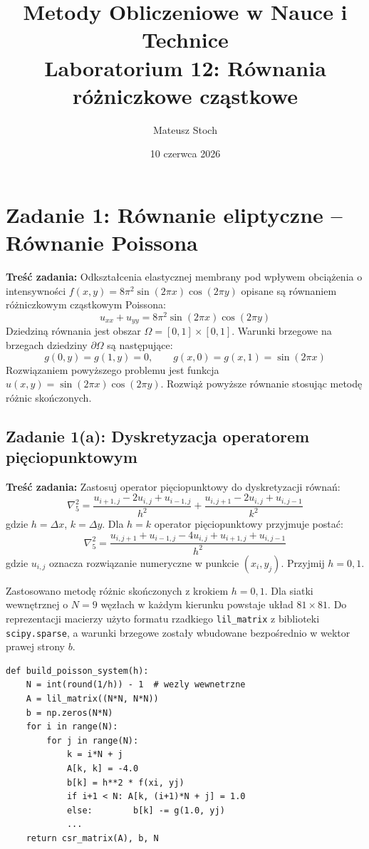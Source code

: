 \documentclass[12pt, a4paper]{article}
\title{
  \textbf{Metody Obliczeniowe w Nauce i Technice} \\[0.5em]
  \large Laboratorium 12: Równania różniczkowe cząstkowe
}
\author{Mateusz Stoch}
\date{10 czerwca 2026}
\begin{document}
\maketitle

\section{Zadanie 1: Równanie eliptyczne -- Równanie Poissona}

\textbf{Treść zadania:} Odkształcenia elastycznej membrany pod wpływem obciążenia o intensywności $f(x,y) = 8\pi^2 \sin(2\pi x)\cos(2\pi y)$ opisane są równaniem różniczkowym cząstkowym Poissona:
\[
  u_{xx} + u_{yy} = 8\pi^2 \sin(2\pi x)\cos(2\pi y)
\]
Dziedziną równania jest obszar $\Omega = [0,1]\times[0,1]$. Warunki brzegowe na brzegach dziedziny $\partial\Omega$ są następujące:
\[
  g(0,y) = g(1,y) = 0, \qquad g(x,0) = g(x,1) = \sin(2\pi x)
\]
Rozwiązaniem powyższego problemu jest funkcja $u(x,y) = \sin(2\pi x)\cos(2\pi y)$. Rozwiąż powyższe równanie stosując metodę różnic skończonych.

\subsection{Zadanie 1(a): Dyskretyzacja operatorem pięciopunktowym}

\textbf{Treść zadania:} Zastosuj operator pięciopunktowy do dyskretyzacji równań:
\[
  \nabla^2_5 = \frac{u_{i+1,j} - 2u_{i,j} + u_{i-1,j}}{h^2} + \frac{u_{i,j+1} - 2u_{i,j} + u_{i,j-1}}{k^2}
\]
gdzie $h = \Delta x$, $k = \Delta y$. Dla $h = k$ operator pięciopunktowy przyjmuje postać:
\[
  \nabla^2_5 = \frac{u_{i,j+1} + u_{i-1,j} - 4u_{i,j} + u_{i+1,j} + u_{i,j-1}}{h^2}
\]
gdzie $u_{i,j}$ oznacza rozwiązanie numeryczne w punkcie $(x_i, y_j)$. Przyjmij $h = 0{,}1$.

Zastosowano metodę różnic skończonych z krokiem $h = 0{,}1$. Dla siatki wewnętrznej o $N = 9$ węzłach w każdym kierunku powstaje układ $81 \times 81$. Do reprezentacji macierzy użyto formatu rzadkiego \texttt{lil\_matrix} z biblioteki \texttt{scipy.sparse}, a warunki brzegowe zostały wbudowane bezpośrednio w wektor prawej strony $b$.

\begin{lstlisting}[caption={Budowanie układu liniowego z operatora pięciopunktowego}]
def build_poisson_system(h):
    N = int(round(1/h)) - 1  # wezly wewnetrzne
    A = lil_matrix((N*N, N*N))
    b = np.zeros(N*N)
    for i in range(N):
        for j in range(N):
            k = i*N + j
            A[k, k] = -4.0
            b[k] = h**2 * f(xi, yj)
            if i+1 < N: A[k, (i+1)*N + j] = 1.0
            else:        b[k] -= g(1.0, yj)
            ...
    return csr_matrix(A), b, N
\end{lstlisting}
\end{document}
